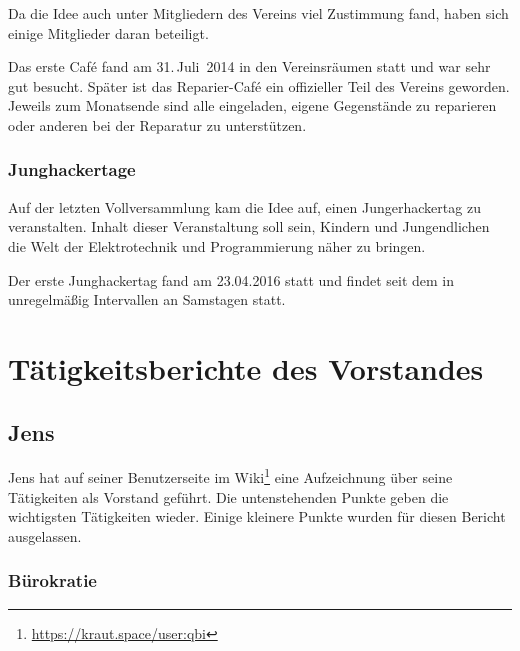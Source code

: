 \documentclass[ngerman]{scrartcl}
\begin{document}
Da die Idee auch unter Mitgliedern des Vereins viel Zustimmung fand,
haben sich einige Mitglieder daran beteiligt.

Das erste Café fand am 31.\,Juli~2014 in den Vereinsräumen statt und
war sehr gut besucht.  Später ist das Reparier-Café ein offizieller
Teil des Vereins geworden. Jeweils zum Monatsende sind alle
eingeladen, eigene Gegenstände zu reparieren oder anderen bei der
Reparatur zu unterstützen.

\subsubsection{Junghackertage}

Auf der letzten Vollversammlung kam die Idee auf, einen
Jungerhackertag zu veranstalten. Inhalt dieser Veranstaltung soll
sein, Kindern und Jungendlichen die Welt der Elektrotechnik und
Programmierung näher zu bringen.

Der erste Junghackertag fand am 23.04.2016 statt und findet seit dem in
unregelmäßig Intervallen an Samstagen statt.

\section{Tätigkeitsberichte des Vorstandes}

\subsection{Jens}

Jens hat auf seiner Benutzerseite im
Wiki\footnote{\url{https://kraut.space/user:qbi}} eine Aufzeichnung über seine
Tätigkeiten als Vorstand geführt. Die untenstehenden Punkte geben die
wichtigsten Tätigkeiten wieder. Einige kleinere Punkte wurden für diesen Bericht
ausgelassen.

\subsubsection{Bürokratie}
\end{document}
